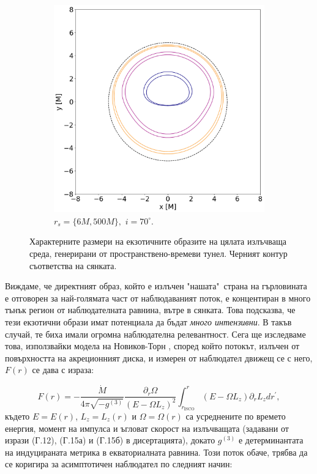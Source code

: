 \documentclass[12pt]{article}
\numberwithin{equation}{section}
\numberwithin{figure}{section}
\begin{document}
\begin{figure}[!htb]
\begin{subfigure}{6cm}
			\includegraphics[scale = 0.35]{Section_6_Morphology_of_the images_of_horizonless_spacetimes/WH_70_deg_r6_r500.png}
			\caption{$r_s = \{6M, 500M\},\,\, i = 70^\circ$.}
		\end{subfigure}
		\caption[Характерните размери на екзотичните образите на цялата излъчваща среда, генерирани от пространствено-времеви тунел.]{\small Характерните размери на екзотичните образите на цялата излъчваща среда, генерирани от пространствено-времеви тунел. Черният контур съответства на сянката.} 
		\label{WH_img_size_deg}
	\end{figure}
	
	Виждаме, че директният образ, който е излъчен "нашата"$\,$ страна на гърловината е отговорен за най-голямата част от наблюдаваният поток, е концентиран в много тънък регион от наблюдателната равнина, вътре в сянката. Това подсказва, че тези екзотични образи имат потенциала да бъдат \emph{много интензивни}. В такъв случай, те биха имали огромна наблюдателна релевантност. Сега ще изследваме това, използвайки модела на Новиков-Торн \cite{Page1973}, според който потокът, излъчен от повърхността на акреционният диска, и измерен от наблюдател движещ се с него, $F(r)$ се дава с израза:
		
	\begin{equation}
		F(r) = - \frac{\dot{M}}{4\pi\sqrt{-g^{(3)}}}\frac{\partial_r\Omega}{\left(E - \Omega L_z\right)^2}\int_{r_\text{ISCO}}^r \left(E - \Omega L_z\right)\partial_rL_zdr^\prime,
	\end{equation}
	където $E = E(r)$, $L_z = L_z(r)$ и $\Omega = \Omega(r)$ са усреднените по времето енергия, момент на импулса и ъгловат скорост на излъчващата (задавани от изрази (Г.12), (Г.15а) и (Г.15б) в дисертацията), докато $g^{(3)}$ е детерминантата на индуцираната метрика в екваториалната равнина. Този поток обаче, трябва да се коригира за асимптотичен наблюдател по следният начин:
	
\end{document}

